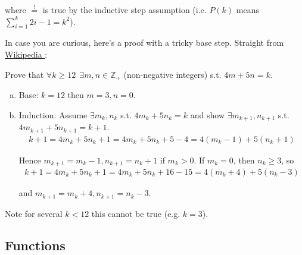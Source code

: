 \documentclass{article}
\begin{document}
\begin{enumerate}
\begin{enumerate}[a)]
\begin{example}
          where $\stackrel{!}{=}$ is true by the inductive step assumption (i.e. $P(k)$ means $\sum^{k}_{i = 1} 2i - 1 = k^2$).
        \end{example}

        In case you are curious, here's a proof with a tricky base step. Straight from \href{https://en.wikipedia.org/wiki/Mathematical_induction#Base_case_other_than_0_or_1}{Wikipedia \ExternalLink}:
        \begin{example}
          Prove that $\forall k \ge 12 ~~ \exists m, n \in \mathbb{Z}_+$ (non-negative integers) s.t. $4m + 5n = k$.
          \begin{enumerate}[a)]
            \item Base: $k = 12$ then $m = 3, n = 0$.
            \item Induction: Assume $\exists m_k, n_k$ s.t. $4m_k + 5n_k = k$ and show $\exists m_{k + 1}, n_{k + 1}$ s.t. $4m_{k + 1} + 5n_{k + 1} = k + 1$.
              \begin{align*}
                k + 1
                = 4m_k + 5n_k + 1
                = 4m_k + 5n_k + 5 - 4
                = 4(m_k - 1) + 5(n_k + 1)
              \end{align*}

              Hence $m_{k + 1} = m_k - 1, n_{k + 1} = n_k + 1$ if $m_k > 0$. If $m_k = 0$, then $n_k \ge 3$, so
              \begin{align*}
                k + 1
                = 4m_k + 5n_k + 1
                = 4m_k + 5n_k + 16 - 15
                = 4(m_k + 4) + 5(n_k - 3)
              \end{align*}

              and $m_{k + 1} = m_k + 4, n_{k + 1} = n_k - 3$.
          \end{enumerate}

          Note for several $k < 12$ this cannot be true (e.g. $k = 3$).
        \end{example}
    \end{enumerate}
\end{enumerate}

\subsection{Functions}
\label{sub:functions}
\end{document}
